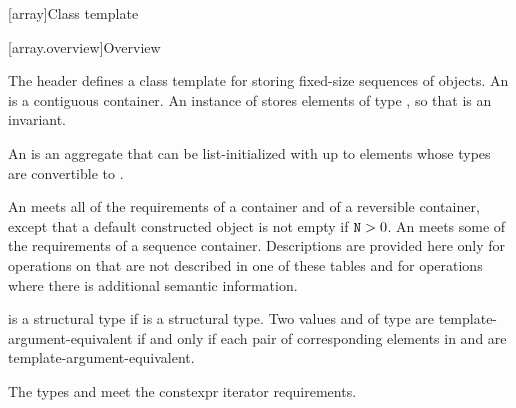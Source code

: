 [array]{Class template }
%

[array.overview]{Overview}

\pnum
{}%
The header  defines a class template for storing fixed-size
sequences of objects.
An  is a contiguous container.
An instance of  stores  elements of type ,
so that  is an invariant.

\pnum
{}%
%
An  is an aggregate that can be
list-initialized with up
to  elements whose types are convertible to .

\pnum
{}%
An  meets all of the requirements
of a container and
of a reversible container,
except that a default
constructed  object is not empty if $\texttt{\protect N} > 0$.
An  meets some of the requirements of a sequence
container.
Descriptions are provided here
only for operations on  that are not described in
one of these tables and
for operations where there is additional semantic information.

\pnum
{} is a structural type if
 is a structural type.
Two values  and  of type 
are template-argument-equivalent if and only if
each pair of corresponding elements in  and 
are template-argument-equivalent.

\pnum
The types  and  meet
the constexpr iterator requirements.

